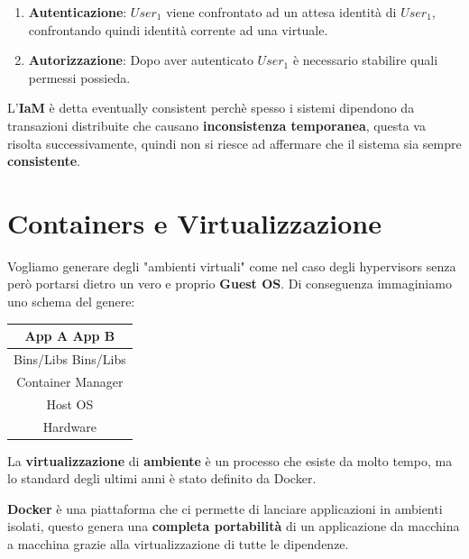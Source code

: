 \documentclass{article}
\begin{document}
\begin{enumerate}
    \item \textbf{Autenticazione}: $User_1$ viene confrontato ad un attesa identità di $User_1$, \\ confrontando quindi identità corrente ad una virtuale.
    \item \textbf{Autorizzazione}: Dopo aver autenticato $User_1$ è necessario stabilire quali permessi possieda.
\end{enumerate}

L'\textbf{IaM} è detta eventually consistent perchè spesso i sistemi dipendono da transazioni distribuite che causano \textbf{inconsistenza temporanea}, questa va risolta successivamente, quindi non si riesce ad affermare che il sistema sia sempre \textbf{consistente}.

\section{Containers e Virtualizzazione}

Vogliamo generare degli "ambienti virtuali" come nel caso degli hypervisors senza però portarsi dietro un vero e proprio \textbf{Guest OS}. Di conseguenza immaginiamo uno schema del genere:

\vspace*{5px}

\begin{center}
        \begin{tabular}{ |c| } %
        \hline
        App A \:\: \vline \:\: App B \\
        \hline
        Bins/Libs \:  \vline \:  Bins/Libs \\
        \hline
         Container Manager \\ 
         \hline
         Host OS \\
         \hline
         Hardware \\
         \hline
        \end{tabular}
    \end{center}

\vspace*{15px}

La \textbf{virtualizzazione} di \textbf{ambiente} è un processo che esiste da molto tempo, ma lo standard degli ultimi anni è stato definito da Docker. 

\textbf{Docker} è una piattaforma che ci permette di lanciare applicazioni in ambienti isolati, questo genera una \textbf{completa portabilità} di un applicazione da macchina a macchina grazie alla virtualizzazione di tutte le dipendenze.
\end{document}
